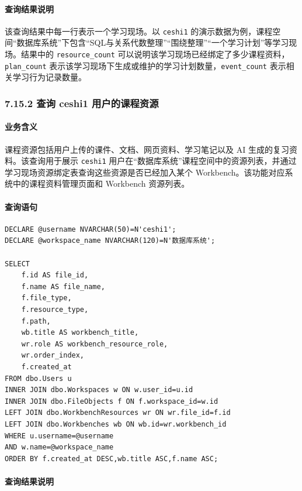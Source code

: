\documentclass[10pt,a4paper,fontset=none]{ctexart}
\begin{document}
\paragraph*{查询结果说明}

该查询结果中每一行表示一个学习现场。以 \texttt{ceshi1} 的演示数据为例，课程空间“数据库系统”下包含“SQL与关系代数整理”“围绕整理”“一个学习计划”等学习现场。结果中的 \texttt{resource\_count} 可以说明该学习现场已经绑定了多少课程资料，\texttt{plan\_count} 表示该学习现场下生成或维护的学习计划数量，\texttt{event\_count} 表示相关学习行为记录数量。\par

\subsubsection*{7.15.2 查询 ceshi1 用户的课程资源}

\paragraph*{业务含义}

课程资源包括用户上传的课件、文档、网页资料、学习笔记以及 AI 生成的复习资料。该查询用于展示 \texttt{ceshi1} 用户在“数据库系统”课程空间中的资源列表，并通过学习现场资源绑定表查询这些资源是否已经加入某个 Workbench。该功能对应系统中的课程资料管理页面和 Workbench 资源列表。\par

\paragraph*{查询语句}

\begin{Verbatim}[fontsize=\scriptsize,frame=single]
DECLARE @username NVARCHAR(50)=N'ceshi1';
DECLARE @workspace_name NVARCHAR(120)=N'数据库系统';

SELECT
    f.id AS file_id,
    f.name AS file_name,
    f.file_type,
    f.resource_type,
    f.path,
    wb.title AS workbench_title,
    wr.role AS workbench_resource_role,
    wr.order_index,
    f.created_at
FROM dbo.Users u
INNER JOIN dbo.Workspaces w ON w.user_id=u.id
INNER JOIN dbo.FileObjects f ON f.workspace_id=w.id
LEFT JOIN dbo.WorkbenchResources wr ON wr.file_id=f.id
LEFT JOIN dbo.Workbenches wb ON wb.id=wr.workbench_id
WHERE u.username=@username
AND w.name=@workspace_name
ORDER BY f.created_at DESC,wb.title ASC,f.name ASC;
\end{Verbatim}

\paragraph*{查询结果说明}
\end{document}

